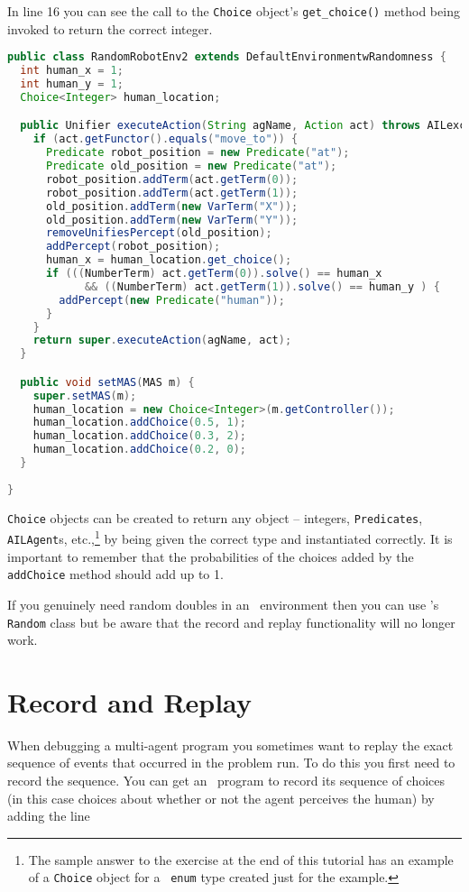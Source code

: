 \documentclass[a4]{article}
\begin{document}
In line 16 you can see the call to the \texttt{Choice} object's \texttt{get\_choice()} method being invoked to return the correct integer.
\begin{lstlisting}[float,caption=RandomRobotEnv2,basicstyle=\sffamily,language=Java,style=easslisting,label=code:RandomRobotEnv2]
public class RandomRobotEnv2 extends DefaultEnvironmentwRandomness {
  int human_x = 1;
  int human_y = 1;
  Choice<Integer> human_location;

  public Unifier executeAction(String agName, Action act) throws AILexception {
    if (act.getFunctor().equals("move_to")) {
      Predicate robot_position = new Predicate("at");
      Predicate old_position = new Predicate("at");
      robot_position.addTerm(act.getTerm(0));
      robot_position.addTerm(act.getTerm(1));
      old_position.addTerm(new VarTerm("X"));
      old_position.addTerm(new VarTerm("Y"));
      removeUnifiesPercept(old_position);
      addPercept(robot_position);
      human_x = human_location.get_choice();
      if (((NumberTerm) act.getTerm(0)).solve() == human_x 
            && ((NumberTerm) act.getTerm(1)).solve() == human_y ) {
        addPercept(new Predicate("human"));
      }
    }
    return super.executeAction(agName, act);
  }

  public void setMAS(MAS m) {
    super.setMAS(m);
    human_location = new Choice<Integer>(m.getController());
    human_location.addChoice(0.5, 1);
    human_location.addChoice(0.3, 2);
    human_location.addChoice(0.2, 0);
  }
	      
}
\end{lstlisting}

\texttt{Choice} objects can be created to return any object -- integers, \texttt{Predicates}, \texttt{AILAgent}s, etc.,\footnote{The sample answer to the exercise at the end of this tutorial has an example of a \texttt{Choice} object for a \java\ \texttt{enum} type created just for the example.} by being given the correct type and instantiated correctly.  It is important to remember that the probabilities of the choices added by the \texttt{addChoice} method should add up to 1.

If you genuinely need random doubles in an \ail\ environment then you can use \java's \texttt{Random} class but be aware that the record and replay functionality will no longer work.

\section{Record and Replay}
When debugging a multi-agent program you sometimes want to replay the exact sequence of events that occurred in the  problem run.  To do this you first need to record the sequence.  You can get an \ail\ program to record its sequence of choices (in this case choices about whether or not the agent perceives the human) by adding the line
\end{document}
